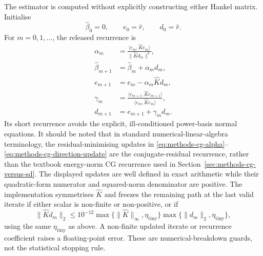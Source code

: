 The estimator is computed without explicitly constructing either Hankel
matrix.  Initialise
\begin{equation}
    \widehat\beta_0=0,
    \qquad e_0=\widehat r,
    \qquad d_0=\widehat r.
\end{equation}
For $m=0,1,\ldots$, the released recurrence is
\begin{align}
    \alpha_m
    &=\frac{\langle e_m,\widehat K e_m\rangle}
            {\|\widehat Kd_m\|^2},
    \label{eq:methods-cg-alpha}\\
    \widehat\beta_{m+1}
    &=\widehat\beta_m+\alpha_md_m,
    \label{eq:methods-cg-beta-update}\\
    e_{m+1}
    &=e_m-\alpha_m\widehat Kd_m,
    \label{eq:methods-cg-residual-update}\\
    \gamma_m
    &=\frac{\langle e_{m+1},\widehat K e_{m+1}\rangle}
            {\langle e_m,\widehat K e_m\rangle},
    \label{eq:methods-cg-gamma}\\
    d_{m+1}
    &=e_{m+1}+\gamma_md_m.
    \label{eq:methods-cg-direction-update}
\end{align}
Its short recurrence avoids the explicit, ill-conditioned power-basis normal equations.  It should be noted that in
standard numerical-linear-algebra terminology, the residual-minimising
updates in \eqref{eq:methods-cg-alpha}--\eqref{eq:methods-cg-direction-update}
are the conjugate-residual recurrence, rather than the textbook energy-norm
CG recurrence used in Section~\ref{sec:methods-cg-versus-sd}.  The displayed
updates are well defined in exact arithmetic while their quadratic-form
numerator and squared-norm denominator are positive.  The implementation
symmetrises $\widehat K$ and freezes the remaining path at the last valid
iterate if either scalar is non-finite or non-positive, or if
\begin{equation}
    \|\widehat Kd_m\|_2
    \leq 10^{-12}
       \max\{\|\widehat K\|_\infty,\eta_{\mathrm{tiny}}\}
       \max\{\|d_m\|_2,\eta_{\mathrm{tiny}}\},
    \label{eq:methods-cg-breakdown-test}
\end{equation}
using the same $\eta_{\mathrm{tiny}}$ as above.  A non-finite updated iterate
or recurrence coefficient raises a floating-point error.  These are
numerical-breakdown guards, not the statistical stopping rule.

